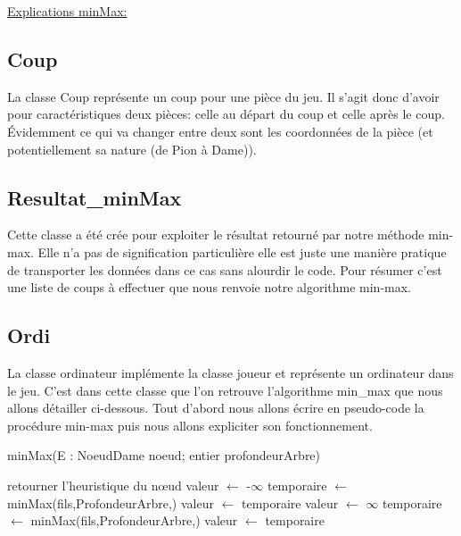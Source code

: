 \documentclass[12,french]{report}
\begin{document}
\pagebreak

\underline{Explications minMax:}\\

\subsection{Coup}

La classe Coup représente un coup pour une pièce du jeu. Il s'agit donc d'avoir pour caractéristiques deux pièces: celle au départ du coup et celle après le coup. Évidemment ce qui va changer entre deux sont les coordonnées de la pièce (et potentiellement sa nature (de Pion à Dame)).

\subsection{Resultat\_minMax}

Cette classe a été crée pour exploiter le résultat retourné par notre méthode min-max. Elle n'a pas de signification particulière elle est juste une manière pratique de transporter les données dans ce cas sans alourdir le code. Pour résumer c'est une liste de coups à effectuer que nous renvoie notre algorithme min-max.

\subsection{Ordi}

La classe ordinateur implémente la classe joueur et représente un ordinateur dans le jeu. C'est dans cette classe que l'on retrouve l'algorithme min\_max que nous allons détailler ci-dessous. Tout d'abord nous allons écrire en pseudo-code la procédure min-max puis nous allons expliciter son fonctionnement.

\begin{algorithm}
	\caption{minMax(E : NoeudDame noeud; entier profondeurArbre)}
	\begin{algorithmic}
		\State retourner l'heuristique du nœud
	\EndIf
		\State valeur $\leftarrow$ -$\infty$
			\State temporaire $\leftarrow$ minMax(fils,ProfondeurArbre,)
				\State valeur $\leftarrow$ temporaire
			\EndIf
		\EndFor
	\Else
		\State valeur $\leftarrow$ $\infty$
		\State temporaire $\leftarrow$ minMax(fils,ProfondeurArbre,)
			\State valeur $\leftarrow$ temporaire
		\EndIf
	\EndIf
	\end{algorithmic}
\end{algorithm}
\end{document}
